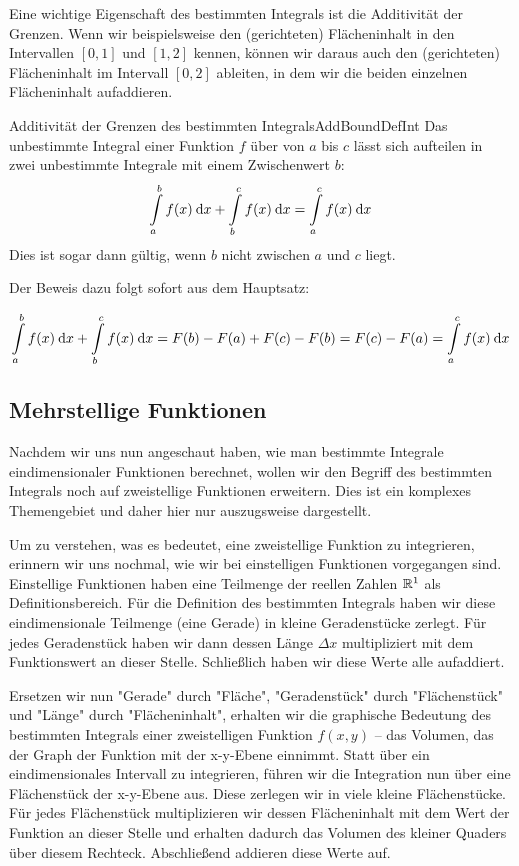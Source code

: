 Eine wichtige Eigenschaft des bestimmten Integrals ist die Additivität der Grenzen. Wenn wir beispielsweise den (gerichteten) Flächeninhalt in den Intervallen $[0,1]$ und $[1,2]$ kennen, können wir daraus auch den (gerichteten) Flächeninhalt im Intervall $[0,2]$ ableiten, in dem wir die beiden einzelnen Flächeninhalt aufaddieren.

\begin{statement}{Additivität der Grenzen des bestimmten Integrals}{AddBoundDefInt}
    Das unbestimmte Integral einer Funktion $f$ über von $a$ bis $c$ lässt sich aufteilen in zwei unbestimmte Integrale mit einem Zwischenwert $b$:
    $$
    \int\limits_a^b f(x) \:\mathrm{d}{x} + \int\limits_b^c f(x) \:\mathrm{d}{x} = \int\limits_a^c f(x) \:\mathrm{d}{x}
    $$
    Dies ist sogar dann gültig, wenn $b$ nicht zwischen $a$ und $c$ liegt.
\end{statement}

Der Beweis dazu folgt sofort aus dem Hauptsatz:

$$
    \int\limits_a^b f(x) \:\mathrm{d}{x} + \int\limits_b^c f(x) \:\mathrm{d}{x} = F(b) - F(a) + F(c) - F(b) = F(c) - F(a) = \int\limits_a^c f(x) \:\mathrm{d}{x}
$$

\subsection{Mehrstellige Funktionen}


Nachdem wir uns nun angeschaut haben, wie man bestimmte Integrale eindimensionaler Funktionen berechnet, wollen wir den Begriff des bestimmten Integrals noch auf zweistellige Funktionen erweitern. Dies ist ein komplexes Themengebiet und daher hier nur auszugsweise dargestellt.

Um zu verstehen, was es bedeutet, eine zweistellige Funktion zu integrieren, erinnern wir uns nochmal, wie wir bei einstelligen Funktionen vorgegangen sind. Einstellige Funktionen haben eine Teilmenge der reellen Zahlen $\mathbb{R}^1$ als Definitionsbereich. Für die Definition des bestimmten Integrals haben wir diese eindimensionale Teilmenge (eine Gerade) in kleine Geradenstücke zerlegt. Für jedes Geradenstück haben wir dann dessen Länge $\Delta x$ multipliziert mit dem Funktionswert an dieser Stelle. Schließlich haben wir diese Werte alle aufaddiert.

Ersetzen wir nun "Gerade" durch "Fläche", "Geradenstück" durch "Flächenstück" und "Länge" durch "Flächeninhalt", erhalten wir die graphische Bedeutung des bestimmten Integrals einer zweistelligen Funktion $f(x,y)$ -- das Volumen, das der Graph der Funktion mit der x-y-Ebene einnimmt. Statt über ein eindimensionales Intervall zu integrieren, führen wir die Integration nun über eine Flächenstück der x-y-Ebene aus. Diese zerlegen wir in viele kleine Flächenstücke. Für jedes Flächenstück multiplizieren wir dessen Flächeninhalt mit dem Wert der Funktion an dieser Stelle und erhalten dadurch das Volumen des kleiner Quaders über diesem Rechteck. Abschließend addieren diese Werte auf.

